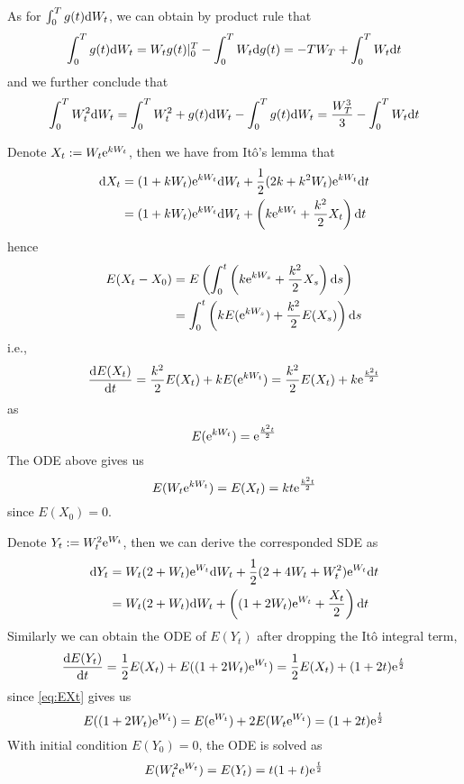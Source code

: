 \documentclass{homework}
\begin{document}
    As for $\int_0^Tg(t)\mathrm d W_t$, we can obtain by product rule that
    \[\int_0^Tg(t)\mathrm d W_t=W_tg(t)|_0^T-\int_0^TW_t\mathrm d g(t)
    =-TW_T+\int_0^TW_t\mathrm d t\]
    and we further conclude that
    \[\int_0^TW_t^2\mathrm d W_t
    =\int_0^TW_t^2+g(t)\mathrm d W_t-\int_0^Tg(t)\mathrm d W_t
    =\frac{W_T^3}{3}-\int_0^TW_t\mathrm d t\]

    \problem
    Denote $X_t:=W_t\mathrm e^{kW_t}$, then we have from It\^o's lemma that
    \[\begin{aligned}
        \mathrm d X_t&=(1+kW_t)\mathrm e^{kW_t}\mathrm d W_t
        +\frac{1}{2}(2k+k^2W_t)\mathrm e^{kW_t}\mathrm d t\\
        &=(1+kW_t)\mathrm e^{kW_t}\mathrm d W_t+\left(k\mathrm e^{kW_t}+\frac{k^2}{2}X_t\right)\mathrm d t
    \end{aligned}\]
    hence
    \[\begin{aligned}
        E(X_t-X_0)&=E\left(\int_0^t\left(k\mathrm e^{kW_s}+\frac{k^2}{2}X_s\right)\mathrm d s\right)\\
        &=\int_0^t\left(kE(\mathrm e^{kW_s})+\frac{k^2}{2}E(X_s)\right)\mathrm d s
    \end{aligned}\]
    i.e.,
    \[\frac{\mathrm d E(X_t)}{\mathrm d t}=\frac{k^2}{2}E(X_t)+kE(\mathrm e^{kW_t})
    =\frac{k^2}{2}E(X_t)+k\mathrm e^{\frac{k^2t}{2}}\]
    as
    \[E(\mathrm e^{kW_t})=\mathrm e^{\frac{k^2t}{2}}\]
    The ODE above gives us
    \begin{equation}
        \label{eq:EXt}
        E(W_t\mathrm e^{kW_t})=E(X_t)=kt\mathrm e^{\frac{k^2t}{2}}
    \end{equation}
    since $E(X_0)=0$.

    Denote $Y_t:=W_t^2\mathrm e^{W_t}$, then we can derive the corresponded SDE as
    \[\begin{aligned}
        \mathrm d Y_t&=W_t(2+W_t)\mathrm e^{W_t}\mathrm d W_t+\frac{1}{2}(2+4W_t+W_t^2)\mathrm e^{W_t}\mathrm d t\\
        &=W_t(2+W_t)\mathrm d W_t+\left((1+2W_t)\mathrm e^{W_t}+\frac{X_t}{2}\right)\mathrm d t
    \end{aligned}\]
    Similarly we can obtain the ODE of $E(Y_t)$ after dropping the It\^o integral term,
    \[\frac{\mathrm d E(Y_t)}{\mathrm d t}=\frac{1}{2}E(X_t)+E((1+2W_t)\mathrm e^{W_t})
    =\frac{1}{2}E(X_t)+(1+2t)\mathrm e^{\frac{t}{2}}\]
    since \cref{eq:EXt} gives us
    \[E((1+2W_t)\mathrm e^{W_t})=E(\mathrm e^{W_t})+2E(W_t\mathrm e^{W_t})=(1+2t)\mathrm e^{\frac{t}{2}}\]
    With initial condition $E(Y_0)=0$, the ODE is solved as
    \[E(W_t^2\mathrm e^{W_t})=E(Y_t)=t(1+t)\mathrm e^{\frac{t}{2}}\]
\end{document}
